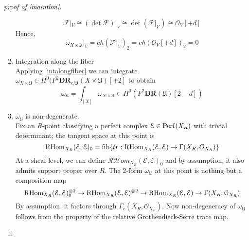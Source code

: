 \begin{proof}[proof of \ref{mainthm}]
\begin{enumerate}
\begin{equation*}
            \mathcal{F}|_V \cong (\det \mathcal{F})|_V \cong \det(\mathcal{F|_V}) \cong \mathcal{O}_V[+d]
        \end{equation*}
        Hence, 
        \begin{equation*}
            \omega_{X \times \mathfrak{U}}|_V = ch(\mathcal{F}|_V)_2=ch(\mathcal{O}_V[+d])_2=0
        \end{equation*}
        \item Integration along the fiber\\
        Applying \ref{intalongfiber} we can integrate $\omega_{X \times \mathfrak{U}} \in H^0(F^2\textbf{DR}_{c/\mathfrak{U}}(X \times \mathfrak{U})[+2]$ to obtain
        \begin{equation*}
          \omega_\mathfrak{U}=\int_{[X]}\omega_{X \times \mathfrak{U}} \in H^0(F^2\textbf{DR}(\mathfrak{U})[2-d])
        \end{equation*}
        \item $\omega_{\mathfrak{U}}$ is non-degenerate.\\
        Fix an $R$-point classifying a perfect complex $\mathcal{E} \in \mathrm{Perf}(X_R)$ with trivial determinant; the tangent space at this point is 
        \begin{equation*}
            \operatorname{RHom}_{X_R}(\mathcal{E}, \mathcal{E})_0=\mathrm{fib}\{tr: \operatorname{RHom}_{X_R}(\mathcal{E}, \mathcal{E}) \to \Gamma(X_R, O_{X_R})\}
        \end{equation*}
        At a sheaf level, we can define $\mathcal{RH}om_{X_R}(\mathcal{E}, \mathcal{E})_0$ and by assumption, it also admits support proper over $R$. The 2-form $\omega_{\mathcal{U}}$ at this point is nothing but a composition map
        \begin{equation*}
            \operatorname{RHom}_{X_R}(\mathcal{E}, \mathcal{E})_0^{\otimes 2} \to \operatorname{RHom}_{X_R}(\mathcal{E}, \mathcal{E})^{\otimes 2} \to \operatorname{RHom}_{X_R}(\mathcal{E}, \mathcal{E}) \to \Gamma(X_R, \mathcal{O}_{X_R})
        \end{equation*}
        By assumption, it factors through $\Gamma_c(X_R, \mathcal{O}_{X_R})$. Now non-degeneracy of $\omega_{\mathfrak{U}}$ follows from the property of the relative Grothendieck-Serre trace map.
    \end{enumerate}
\end{proof}
